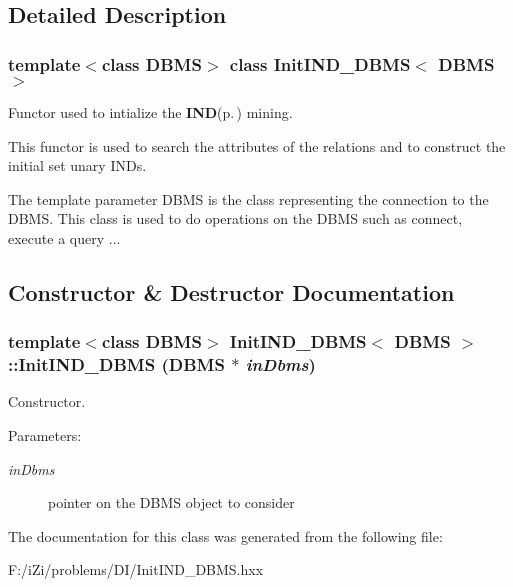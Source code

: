 \subsection{Detailed Description}
\subsubsection*{template$<$class DBMS$>$ class Init\-IND\_\-DBMS$<$ DBMS $>$}

Functor used to intialize the {\bf IND}{\rm (p.\,\pageref{class_i_n_d})} mining. 

This functor is used to search the attributes of the relations and to construct the initial set unary INDs.

The template parameter DBMS is the class representing the connection to the DBMS. This class is used to do operations on the DBMS such as connect, execute a query ... 



\subsection{Constructor \& Destructor Documentation}
\subsubsection{\setlength{\rightskip}{0pt plus 5cm}template$<$class DBMS$>$ {\bf Init\-IND\_\-DBMS}$<$ DBMS $>$::{\bf Init\-IND\_\-DBMS} (DBMS $\ast$ {\em in\-Dbms})\hspace{0.3cm}{\tt  [inline]}}\label{class_init_i_n_d___d_b_m_s_fabad477760e0e4d049afba904f5388c}


Constructor. 

\begin{Desc}
\item[Parameters:]
\begin{description}
\item[{\em in\-Dbms}]pointer on the DBMS object to consider \end{description}
\end{Desc}


The documentation for this class was generated from the following file:\begin{CompactItemize}
\item 
F:/i\-Zi/problems/DI/Init\-IND\_\-DBMS.hxx\end{CompactItemize}
